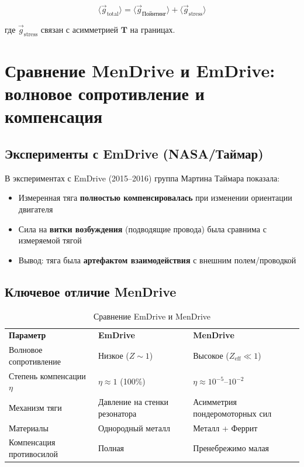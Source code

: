 \documentclass[a4paper,12pt]{article}
\begin{document}
\begin{equation}
\langle \vec{g}_{\text{total}} \rangle = \langle \vec{g}_{\text{Пойнтинг}}
\rangle + \langle \vec{g}_{\text{stress}} \rangle
\label{eq:total_momentum_density}
\end{equation}

где $\vec{g}_{\text{stress}}$ связан с асимметрией $\mathbf{T}$ на границах.

\section{Сравнение MenDrive и EmDrive: волновое сопротивление и компенсация}

\subsection{Эксперименты с EmDrive (NASA/Таймар)}

В экспериментах с EmDrive (2015--2016) группа Мартина Таймара \cite{Tajmar2016}
показала:

\begin{itemize}
    \item Измеренная тяга \textbf{полностью компенсировалась} при изменении
    ориентации двигателя
    \item Сила на \textbf{витки возбуждения} (подводящие провода) была
    сравнима с измеряемой тягой
    \item Вывод: тяга была \textbf{артефактом взаимодействия} с внешним
    полем/проводкой
\end{itemize}

\subsection{Ключевое отличие MenDrive}

\begin{table}[h]
\centering
\caption{Сравнение EmDrive и MenDrive}
\label{tab:emdrive_vs_mendrive}
\begin{tabular}{lll}
\textbf{Параметр} & \textbf{EmDrive} & \textbf{MenDrive} \\
Волновое сопротивление & Низкое ($Z \sim 1$) & Высокое ($Z_{\text{eff}} \ll 1$) \\
Степень компенсации $\eta$ & $\eta \approx 1$ (100\%) & $\eta \approx 10^{-5}$--$10^{-2}$ \\
Механизм тяги & Давление на стенки резонатора & Асимметрия пондеромоторных сил \\
Материалы & Однородный металл & Металл + Феррит \\
Компенсация противосилой & Полная & Пренебрежимо малая \\
\end{tabular}
\end{table}
\end{document}
